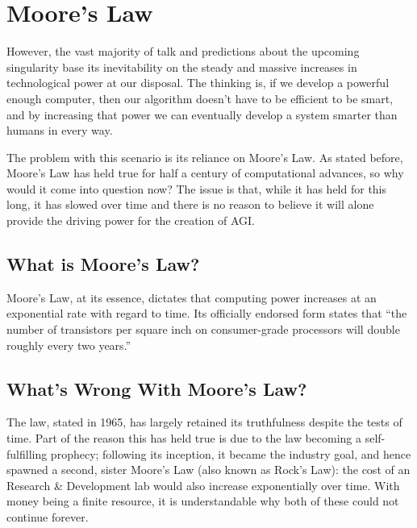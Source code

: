\documentclass[12pt]{article} %
\begin{document}
\section{Moore's Law}

However, the vast majority of talk and predictions about the upcoming singularity base its inevitability on the steady and massive increases in technological power at our disposal\cite{wbw2}. The thinking is, if we develop a powerful enough computer, then our algorithm doesn't have to be efficient to be smart, and by increasing that power we can eventually develop a system smarter than humans in every way.

The problem with this scenario is its reliance on Moore's Law. As stated before, Moore's Law has held true for half a century of computational advances, so why would it come into question now? The issue is that, while it has held for this long, it has slowed over time and there is no reason to believe it will alone provide the driving power for the creation of AGI.


\subsection{What is Moore's Law?} %

Moore's Law, at its essence, dictates that computing power increases at an exponential rate with regard to time. Its officially endorsed form states that ``the number of transistors per square inch on consumer-grade processors will double roughly every two years.''\cite{wikimooreslaw}


\subsection{What's Wrong With Moore's Law?} %

The law, stated in 1965, has largely retained its truthfulness despite the tests of time. Part of the reason this has held true is due to the law becoming a self-fulfilling prophecy; following its inception, it became the industry goal, and hence spawned a second, sister Moore's Law (also known as Rock's Law): the cost of an Research \& Development lab would also increase exponentially over time. With money being a finite resource, it is understandable why both of these could not continue forever\cite{memristor}.
\end{document}
